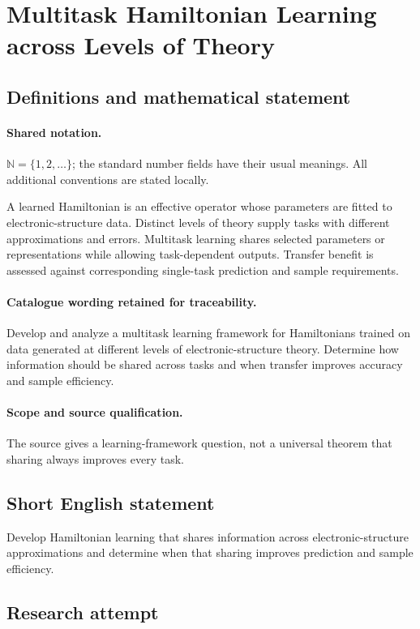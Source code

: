 \documentclass[11pt]{article}
\begin{document}
\section{Multitask Hamiltonian Learning across Levels of Theory}\label{statement}

\subsection{Definitions and mathematical statement}

\paragraph{Shared notation.}$\mathbb N=\{1,2,\ldots\}$; the standard number fields have their usual meanings. All additional conventions are stated locally.


A learned Hamiltonian is an effective operator whose parameters are fitted to electronic-structure data. Distinct levels of theory supply tasks with different approximations and errors. Multitask learning shares selected parameters or representations while allowing task-dependent outputs. Transfer benefit is assessed against corresponding single-task prediction and sample requirements.

\paragraph{Catalogue wording retained for traceability.}
Develop and analyze a multitask learning framework for Hamiltonians trained on data generated at different levels of electronic-structure theory. Determine how information should be shared across tasks and when transfer improves accuracy and sample efficiency.

\paragraph{Scope and source qualification.}The source gives a learning-framework question, not a universal theorem that sharing always improves every task.
\subsection{Short English statement}
Develop Hamiltonian learning that shares information across electronic-structure approximations and determine when that sharing improves prediction and sample efficiency.
\subsection{Research attempt}
\end{document}
